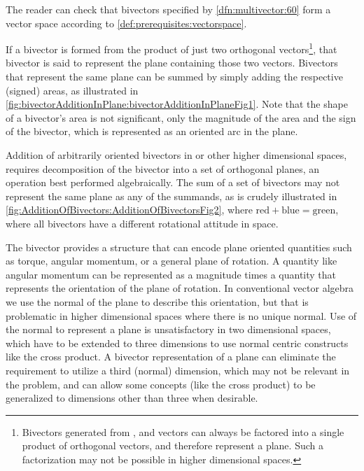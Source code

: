 The reader can check that bivectors specified by \cref{dfn:multivector:60} form a vector space according to \cref{def:prerequisites:vectorspace}.

If a bivector is formed from the product of just two orthogonal vectors\footnote{Bivectors generated from , and  vectors can always be factored into a single product of orthogonal vectors, and therefore represent a plane.  Such a factorization may not be possible in higher dimensional spaces.}, that bivector is said to represent the plane containing those two vectors.
Bivectors that represent the same plane can be summed by simply adding the respective (signed) areas, as illustrated in
\cref{fig:bivectorAdditionInPlane:bivectorAdditionInPlaneFig1}.
Note that the shape of a bivector's area is not significant, only the magnitude of the area and the sign of the bivector, which is represented as an oriented arc in the plane.

Addition of arbitrarily oriented bivectors in  or other higher dimensional spaces, requires decomposition of the bivector into a set of orthogonal planes, an operation best performed algebraically.  The sum of a set of bivectors may not represent the same plane as any of the summands, as is crudely illustrated in
\cref{fig:AdditionOfBivectors:AdditionOfBivectorsFig2}, where \( \text{red} + \text{blue} = \text{green} \), where all bivectors have a different rotational attitude in space.

The bivector provides a structure that can encode plane oriented quantities such as torque, angular momentum, or a general plane of rotation.
A quantity like angular momentum can be represented as a magnitude times a quantity that represents the orientation of the plane of rotation.
In conventional vector algebra we use the normal of the plane to describe this orientation, but that is problematic in higher dimensional spaces where there is no unique normal.
Use of the normal to represent a plane is unsatisfactory in two dimensional spaces, which have to be extended to three dimensions to use normal centric constructs like the cross product.
A bivector representation of a plane can eliminate the requirement to utilize a third (normal) dimension, which may not be relevant in the problem, and can allow some concepts (like the cross product) to be generalized to dimensions other than three when desirable.

